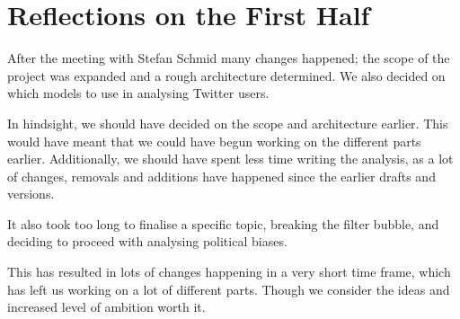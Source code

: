 \section{Reflections on the First Half}\label{sec:FirRef}
After the meeting with Stefan Schmid many changes happened; the scope of the
project was expanded and a rough architecture determined. We also decided
on which models to use in analysing Twitter users.\nl

In hindsight, we should have decided on the scope and architecture earlier. This
would have meant that we could have begun working on the different parts
earlier. Additionally, we should have spent less time writing the analysis, as a
lot of changes, removals and additions have happened since the earlier drafts
and versions.\nl

It also took too long to finalise a specific topic, breaking the
filter bubble, and deciding to proceed with analysing political biases.\nl

This has resulted in lots of changes happening in a very short time frame,
which has left us working on a lot of different parts. Though we consider the
ideas and increased level of ambition worth it.